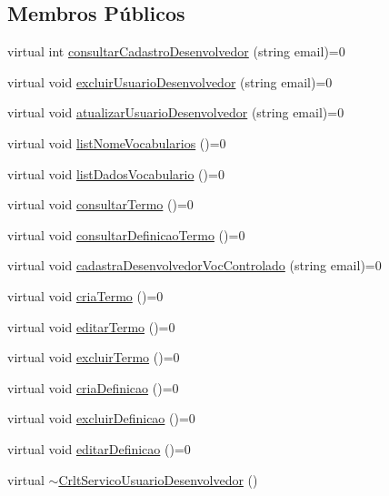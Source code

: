 \subsection*{Membros Públicos}
\begin{DoxyCompactItemize}
\item 
virtual int \mbox{\hyperlink{class_crlt_servico_usuario_desenvolvedor_ad0e0d85a9a4763960f021fca4cf36f29}{consultar\+Cadastro\+Desenvolvedor}} (string email)=0
\item 
virtual void \mbox{\hyperlink{class_crlt_servico_usuario_desenvolvedor_aa106326b5823377bd842b7448e0b4ee3}{excluir\+Usuario\+Desenvolvedor}} (string email)=0
\item 
virtual void \mbox{\hyperlink{class_crlt_servico_usuario_desenvolvedor_a63705805bc01450509e7719e2a57b1da}{atualizar\+Usuario\+Desenvolvedor}} (string email)=0
\item 
virtual void \mbox{\hyperlink{class_crlt_servico_usuario_desenvolvedor_abb3f10c499ac67d02987f0860150393d}{list\+Nome\+Vocabularios}} ()=0
\item 
virtual void \mbox{\hyperlink{class_crlt_servico_usuario_desenvolvedor_a8fb9d062db341aa57ee44ff7b5049652}{list\+Dados\+Vocabulario}} ()=0
\item 
virtual void \mbox{\hyperlink{class_crlt_servico_usuario_desenvolvedor_a328f8ac2978c844ed4331d61ebfce32a}{consultar\+Termo}} ()=0
\item 
virtual void \mbox{\hyperlink{class_crlt_servico_usuario_desenvolvedor_acde5327b99fb4357276c4b0ab83fa20b}{consultar\+Definicao\+Termo}} ()=0
\item 
virtual void \mbox{\hyperlink{class_crlt_servico_usuario_desenvolvedor_a8eb6d3af46ac497a394882ef0fe32eb1}{cadastra\+Desenvolvedor\+Voc\+Controlado}} (string email)=0
\item 
virtual void \mbox{\hyperlink{class_crlt_servico_usuario_desenvolvedor_a924f7dcd059d8ff265909d29457a961b}{cria\+Termo}} ()=0
\item 
virtual void \mbox{\hyperlink{class_crlt_servico_usuario_desenvolvedor_a60098c3dd81dfb83ea03f4b7ace785dc}{editar\+Termo}} ()=0
\item 
virtual void \mbox{\hyperlink{class_crlt_servico_usuario_desenvolvedor_a95825708aeed4c1f6a5829ad4bd29673}{excluir\+Termo}} ()=0
\item 
virtual void \mbox{\hyperlink{class_crlt_servico_usuario_desenvolvedor_af9f1bd8b7ec576adb4bc2a8ac14e0905}{cria\+Definicao}} ()=0
\item 
virtual void \mbox{\hyperlink{class_crlt_servico_usuario_desenvolvedor_a518fe0443e450a73a7274b8dbef74a71}{excluir\+Definicao}} ()=0
\item 
virtual void \mbox{\hyperlink{class_crlt_servico_usuario_desenvolvedor_ae8e2d1d6954d5c4861d3cc40c525f725}{editar\+Definicao}} ()=0
\item 
virtual \mbox{\hyperlink{class_crlt_servico_usuario_desenvolvedor_aa38067f9202f32202dc783e468fd7430}{$\sim$\+Crlt\+Servico\+Usuario\+Desenvolvedor}} ()
\end{DoxyCompactItemize}


